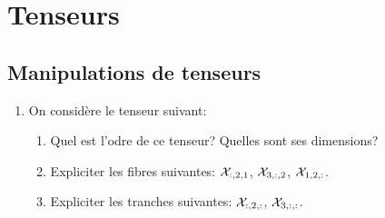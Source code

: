 \chapter{Tenseurs}

\section{Manipulations de tenseurs}

\begin{enumerate}
\item On considère le tenseur suivant:
\begin{enumerate}
	\item Quel est l'odre de ce tenseur? Quelles sont ses dimensions?
	\item Expliciter les fibres suivantes: $\mathcal{X}_{:,2,1}$, $\mathcal{X}_{3,:,2}$, $\mathcal{X}_{1,2,:}$.
	\item Expliciter les tranches suivantes: $\mathcal{X}_{:,2,:}$, $\mathcal{X}_{3,:,:}$. 
\end{enumerate}


\end{enumerate}
